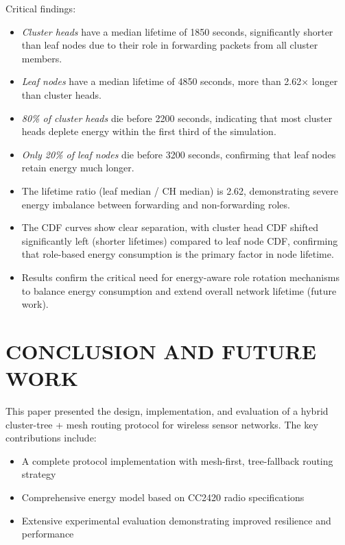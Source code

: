 \documentclass[conference]{IEEEtran}
\begin{document}
Critical findings:
\begin{itemize}
    \item \emph{Cluster heads} have a median lifetime of 1850 seconds, significantly shorter than leaf nodes due to their role in forwarding packets from all cluster members.
    \item \emph{Leaf nodes} have a median lifetime of 4850 seconds, more than 2.62× longer than cluster heads.
    \item \emph{80\% of cluster heads} die before 2200 seconds, indicating that most cluster heads deplete energy within the first third of the simulation.
    \item \emph{Only 20\% of leaf nodes} die before 3200 seconds, confirming that leaf nodes retain energy much longer.
    \item The lifetime ratio (leaf median / CH median) is 2.62, demonstrating severe energy imbalance between forwarding and non-forwarding roles.
    \item The CDF curves show clear separation, with cluster head CDF shifted significantly left (shorter lifetimes) compared to leaf node CDF, confirming that role-based energy consumption is the primary factor in node lifetime.
    \item Results confirm the critical need for energy-aware role rotation mechanisms to balance energy consumption and extend overall network lifetime (future work).
\end{itemize}

\section{CONCLUSION AND FUTURE WORK}

This paper presented the design, implementation, and evaluation of a hybrid cluster-tree + mesh routing protocol for wireless sensor networks. The key contributions include:

\begin{itemize}
    \item A complete protocol implementation with mesh-first, tree-fallback routing strategy
    \item Comprehensive energy model based on CC2420 radio specifications
    \item Extensive experimental evaluation demonstrating improved resilience and performance
\end{itemize}
\end{document}
